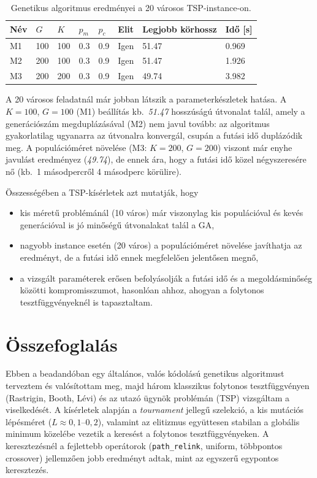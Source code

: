 \documentclass[a4paper,12pt]{article}
\begin{document}
\begin{table}[H]
  \centering
  \begin{tabular}{llllllll}
    \toprule
    Név & $G$ & $K$ & $p_m$ & $p_c$ & Elit & Legjobb körhossz & Idő [s] \\
    \midrule
    M1 & 100 & 100 & 0.3 & 0.9 & Igen & 51.47 & 0.969 \\
    M2 & 200 & 100 & 0.3 & 0.9 & Igen & 51.47 & 1.926 \\ 
    M3 & 200 & 200 & 0.3 & 0.9 & Igen & 49.74 & 3.982 \\
    \bottomrule
  \end{tabular}
  \caption{Genetikus algoritmus eredményei a 20 városos TSP-instance-on.}
  \label{tab:tsp20}
\end{table}

A 20 városos feladatnál már jobban látszik a parameterkészletek hatása.
A $K=100$, $G=100$ (M1) beállítás kb.\ \emph{51.47} hosszúságú útvonalat
talál, amely a generációszám megduplázásával (M2) nem javul tovább: az
algoritmus gyakorlatilag ugyanarra az útvonalra konvergál, csupán a futási idő
duplázódik meg. A populációméret növelése (M3: $K=200$, $G=200$) viszont már
enyhe javulást eredményez (\emph{49.74}), de ennek ára, hogy a futási idő
közel négyszeresére nő (kb.\ 1 másodpercről 4 másodperc körülire).

Összességében a TSP-kísérletek azt mutatják, hogy
\begin{itemize}
  \item kis méretű problémánál (10 város) már viszonylag kis populációval
        és kevés generációval is jó minőségű útvonalakat talál a GA,
  \item nagyobb instance esetén (20 város) a populációméret növelése
        javíthatja az eredményt, de a futási idő ennek megfelelően
        jelentősen megnő,
  \item a vizsgált paraméterek erősen befolyásolják a futási idő és
        a megoldásminőség közötti kompromisszumot, hasonlóan ahhoz,
        ahogyan a folytonos tesztfüggvényeknél is tapasztaltam.
\end{itemize}

\section{Összefoglalás}

Ebben a beadandóban egy általános, valós kódolású genetikus algoritmust
terveztem és valósítottam meg, majd három klasszikus folytonos
tesztfüggvényen (Rastrigin, Booth, Lévi) és az utazó ügynök problémán
(TSP) vizsgáltam a viselkedését. A kísérletek alapján a
\emph{tournament} jellegű szelekció, a kis mutációs lépésméret
($L\approx 0{,}1$--$0{,}2$), valamint az elitizmus együttesen
stabilan a globális minimum közelébe vezetik a keresést a folytonos
tesztfüggvényeken. A keresztezésnél a fejlettebb operátorok
(\texttt{path\_relink}, uniform, többpontos crossover) jellemzően
jobb eredményt adtak, mint az egyszerű egypontos keresztezés.
\end{document}
